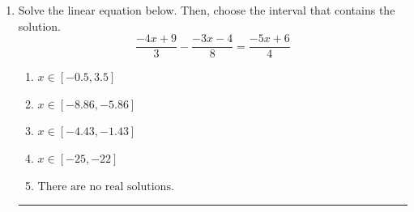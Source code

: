 \documentclass[14pt]{extbook}
\newcommand{\litem}[1]{\item#1\hspace*{-1cm}\rule{\textwidth}{0.4pt}}
\begin{document}
\begin{enumerate}
{\begin{enumerate}[label=\Alph*.]
\end{enumerate} }
\litem{
Solve the linear equation below. Then, choose the interval that contains the solution.\[ \frac{-4x + 9}{3} - \frac{-3x -4}{8} = \frac{-5x + 6}{4} \]\begin{enumerate}[label=\Alph*.]
\item \( x \in [-0.5, 3.5] \)
\item \( x \in [-8.86, -5.86] \)
\item \( x \in [-4.43, -1.43] \)
\item \( x \in [-25, -22] \)
\item \( \text{There are no real solutions.} \)

\end{enumerate} }
\end{enumerate}
\end{document}
